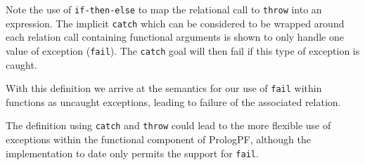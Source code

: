 Note the use of \texttt{if-then-else} to map the relational call to
\texttt{throw} into an expression.  The implicit \texttt{catch} which can
be considered to be wrapped around each relation call containing functional
arguments is shown to only handle one value of exception (\texttt{fail}).
The \texttt{catch} goal will then fail if this type of exception is
caught.

With this definition we arrive at the semantics for our use of
\texttt{fail} within functions as uncaught exceptions, leading to
failure of the associated relation.

The definition using \texttt{catch} and \texttt{throw}
could lead to the more flexible use of exceptions within
the functional component of PrologPF,  although the implementation to
date only permits the support for \texttt{fail}.


